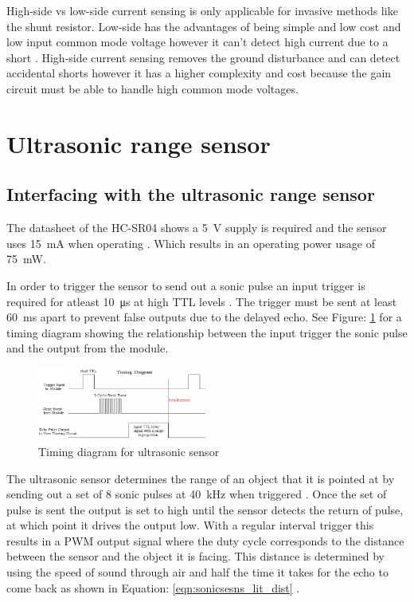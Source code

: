 High-side vs low-side current sensing is only applicable for invasive methods like the shunt resistor. Low-side has the advantages of being simple and low cost and low input common mode voltage however it can't detect high current due to a short \cite{EG_CurSens}. High-side current sensing removes the ground disturbance and can detect accidental shorts however it has a higher complexity and cost because the gain circuit must be able to handle high common mode voltages\cite{EG_CurSens}.  

\clearpage
\section{Ultrasonic range sensor}
\subsection{Interfacing with the ultrasonic range sensor}
The datasheet of the HC-SR04 shows a \SI{5}{\volt} supply is required and the sensor uses \SI{15}{\milli\ampere} when operating \cite{Design_SonicSens}. Which results in an operating power usage of \SI{75}{\milli\watt}.


In order to trigger the sensor to send out a sonic pulse an input trigger is required for atleast \SI{10}{\micro\second} at high TTL levels \cite{Design_SonicSens}. The trigger must be sent at least \SI{60}{\milli\second} apart to prevent false outputs due to the delayed echo\cite{Design_SonicSens}. See Figure: \ref{fig:sonicsen_timing} for a timing diagram showing the relationship between the input trigger the sonic pulse and the output from the module.

\begin{figure}[H]
\centering
\includegraphics[width=0.5\textwidth]{./Figures/SonicSens_Timing.png}
\caption{Timing diagram for ultrasonic sensor\cite{Design_SonicSens}}
\label{fig:sonicsen_timing}	
\end{figure}

The ultrasonic sensor determines the range of an object that it is pointed at by sending out a set of 8 sonic pulses at \SI{40}{\kilo\hertz} when triggered \cite{Design_SonicSens}.  Once the set of pulse is sent the output is set to high until the sensor detects the return of pulse, at which point it drives the output low. With a regular interval trigger this results in a PWM output signal where the duty cycle corresponds to the distance between the sensor and the object it is facing. This distance is determined by using the speed of sound through air and half the time it takes for the echo to come back as shown in Equation: \ref{eqn:sonicsesns_lit_dist} \cite{Design_SonicSens}.

